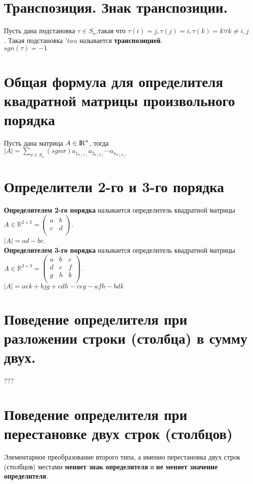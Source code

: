 \documentclass[a4paper,11pt]{report}
\DeclareMathOperator{\Mn}{{\rm I\!R}^{n}}
\begin{document}
\section{Транспозиция. Знак транспозиции.}
Пусть дана подстановка $\tau \in S_n$,такая что $\tau(i) = j, \tau(j) = i, \tau(k) = k \forall k \neq i, j$. 
Такая подстановка $'tau$ называется \textbf{транспозицией}.\\
$sgn(\tau) = -1$\\
\section{Общая формула для определителя квадратной матрицы произвольного порядка}
Пусть дана матрица $A \in \Mn$, тогда\\
$|A| = \sum\limits_{\sigma \in S_n}(sgn\sigma)a_1_{\sigma(1)}a_2_{\sigma(2)}\cdots{a_n_{\sigma(n)}}$
\section{Определители 2-го и 3-го порядка}
\textbf{Определителем 2-го порядка} называется определитель квадратной матрицы $A \in \mathbb{R}^{2\times{2}} = 
\begin{pmatrix}
a & b\\
c & d\\
\end{pmatrix}
$.\\
$|A| = ad - bc$.\\
\textbf{Определителем 3-го порядка} называется определитель квадратной матрицы $A \in \mathbb{R}^{3\times{3}} =
\begin{pmatrix}
 a & b & c\\
 d & e & f\\
 g & h & k\\
\end{pmatrix}
$.\\
$|A| = aek + bjg + cdh - ceg - afh - bdk$\\
\section{Поведение определителя при разложении строки (столбца) в сумму двух.}
???
\section{Поведение определителя при перестановке двух строк (столбцов)} 
Элементарное преобразование второго типа, а именно перестановка двух строк (столбцов) местами
\textbf{меняет знак определителя} и \textbf{не меняет значение определителя}.
\end{document}
